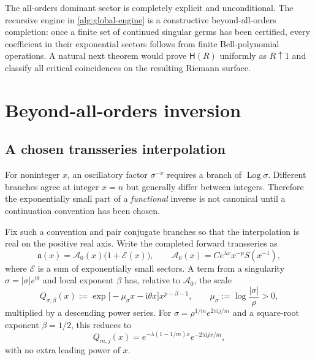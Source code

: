 \documentclass[11pt,oneside]{article}
\numberwithin{equation}{section}
\theoremstyle{plain}
\theoremstyle{definition}
\theoremstyle{remark}
\newcommand{\ii}{\mathrm i}
\newcommand{\Log}{\operatorname{Log}}
\begin{document}
\begin{frontierbox}
The all-orders dominant sector is completely explicit and unconditional.
The recursive engine in \cref{alg:global-engine} is a constructive
beyond-all-orders completion: once a finite set of continued singular germs
has been certified, every coefficient in their exponential sectors follows
from finite Bell-polynomial operations.  A natural next theorem would prove
$\mathsf H(R)$ uniformly as $R\uparrow1$ and classify all critical
coincidences on the resulting Riemann surface.
\end{frontierbox}

\section{Beyond-all-orders inversion}\label{sec:inverse-exponential}

\subsection{A chosen transseries interpolation}

For noninteger $x$, an oscillatory factor $\sigma^{-x}$ requires a branch of
$\Log\sigma$.  Different branches agree at integer $x=n$ but generally
differ between integers.  Therefore the exponentially small part of a
\emph{functional} inverse is not canonical until a continuation convention
has been chosen.

Fix such a convention and pair conjugate branches so that the interpolation
is real on the positive real axis.  Write the completed forward transseries
as
\begin{equation}\label{eq:full-interpolation}
 \mathfrak a(x)=\mathcal A_0(x)\bigl(1+\mathcal E(x)\bigr),
 \qquad
 \mathcal A_0(x)=Ce^{\lambda x}x^{-p}S(x^{-1}),
\end{equation}
where $\mathcal E$ is a sum of exponentially small sectors.  A term from a
singularity $\sigma=|\sigma|e^{\ii\theta}$ and local exponent $\beta$ has,
relative to $\mathcal A_0$, the scale
\begin{equation}\label{eq:relative-general-sector}
 Q_{\sigma,\beta}(x)
 :=\exp\!\bigl[-\mu_\sigma x-\ii\theta x\bigr]
 x^{p-\beta-1},
 \qquad
 \mu_\sigma:=\log\frac{|\sigma|}{\rho}>0,
\end{equation}
multiplied by a descending power series.  For
$\sigma=\rho^{1/m}e^{2\pi\ii j/m}$ and a square-root exponent
$\beta=1/2$, this reduces to
\begin{equation}\label{eq:root-inverse-monomial}
 Q_{m,j}(x)=
 e^{-\lambda(1-1/m)x}e^{-2\pi\ii jx/m},
\end{equation}
with no extra leading power of $x$.
\end{document}

